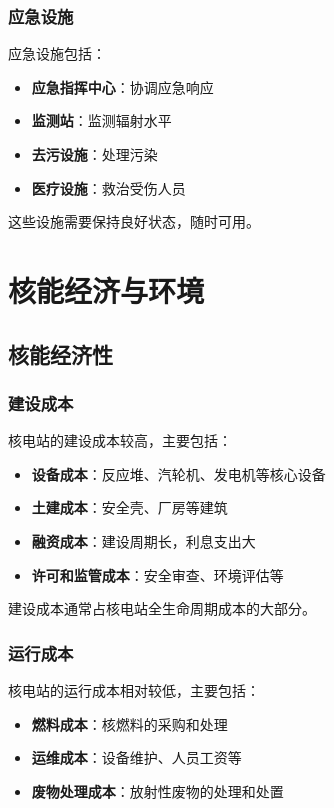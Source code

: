 \documentclass[12pt,UTF8]{ctexbook}
\begin{document}
\section{应急设施}

应急设施包括：

\begin{itemize}[leftmargin=2cm]
    \item \textbf{应急指挥中心}：协调应急响应
    \item \textbf{监测站}：监测辐射水平
    \item \textbf{去污设施}：处理污染
    \item \textbf{医疗设施}：救治受伤人员
\end{itemize}

这些设施需要保持良好状态，随时可用。

\part{核能经济与环境}

\chapter{核能经济性}

\section{建设成本}

核电站的建设成本较高，主要包括：

\begin{itemize}[leftmargin=2cm]
    \item \textbf{设备成本}：反应堆、汽轮机、发电机等核心设备
    \item \textbf{土建成本}：安全壳、厂房等建筑
    \item \textbf{融资成本}：建设周期长，利息支出大
    \item \textbf{许可和监管成本}：安全审查、环境评估等
\end{itemize}

建设成本通常占核电站全生命周期成本的大部分。

\section{运行成本}

核电站的运行成本相对较低，主要包括：

\begin{itemize}[leftmargin=2cm]
    \item \textbf{燃料成本}：核燃料的采购和处理
    \item \textbf{运维成本}：设备维护、人员工资等
    \item \textbf{废物处理成本}：放射性废物的处理和处置
\end{itemize}
\end{document}
